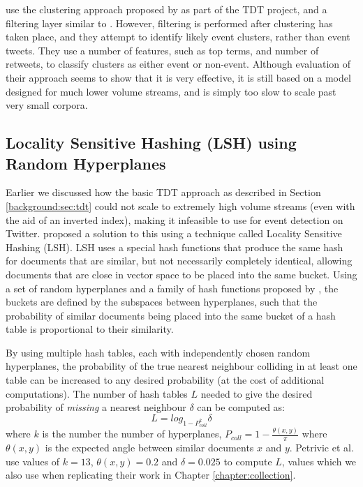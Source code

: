 \cite{becker2011beyond} use the clustering approach proposed by \cite{Yang98} as part of the TDT project, and a filtering layer similar to \cite{sankaranarayanan2009twitterstand}.
However, filtering is performed after clustering has taken place, and they attempt to identify likely event clusters, rather than event tweets.
They use a number of features, such as top terms, and number of retweets, to classify clusters as either event or non-event.
Although evaluation of their approach seems to show that it is very effective, it is still based on a model designed for much lower volume streams, and is simply too slow to scale past very small corpora.



\subsection{Locality Sensitive Hashing (LSH) using Random Hyperplanes}
\label{background:sec:lsh}
Earlier we discussed how the basic TDT approach as described in Section \ref{background:sec:tdt} could not scale to extremely high volume streams (even with the aid of an inverted index), making it infeasible to use for event detection on Twitter.
\cite{Petrovic:2010:SFS:1857999.1858020} proposed a solution to this using a technique called Locality Sensitive Hashing (LSH).
LSH uses a special hash functions that produce the same hash for documents that are similar, but not necessarily completely identical, allowing documents that are close in vector space to be placed into the same bucket.
Using a set of random hyperplanes and a family of hash functions proposed by \cite{Charikar2002}, the buckets are defined by the subspaces between hyperplanes, such that the probability of similar documents being placed into the same bucket of a hash table is proportional to their similarity.

By using multiple hash tables, each with independently chosen random hyperplanes, the probability of the true nearest neighbour colliding in at least one table can be increased to any desired probability (at the cost of additional computations).
The number of hash tables $L$ needed to give the desired probability of \emph{missing} a nearest neighbour $\delta$ can be computed as:
\begin{displaymath}
	L = log_{1-P^k_{coll}} \delta
\end{displaymath}
where $k$ is the number the number of hyperplanes, $P_{coll} = 1-\frac{\theta(x,y)}{\pi}$ where $\theta(x,y)$ is the expected angle between similar documents $x$ and $y$.
Petrivic et al. use values of $k = 13$, $\theta(x,y) = 0.2$ and $\delta = 0.025$ to compute $L$, values which we also use when replicating their work in Chapter \ref{chapter:collection}.

